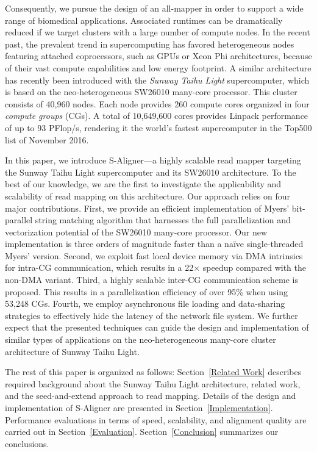 \documentclass[conference]{IEEEtran}
\begin{document}
Consequently, we pursue the design of an all-mapper in order to support a wide range of biomedical applications. Associated runtimes can be dramatically reduced if we target clusters with a large number of compute nodes. In the recent past, the prevalent trend in supercomputing has favored heterogeneous nodes featuring attached coprocessors, such as GPUs or Xeon Phi architectures, because of their vast compute capabilities and low energy footprint. A similar architecture has recently been introduced with the \emph{Sunway Taihu Light} supercomputer, which is based on the neo-heterogeneous SW26010 many-core processor. This cluster consists of 40,960 nodes. Each node provides 260 compute cores organized in four {\em compute groups} (CGs). A total of 10,649,600 cores provides Linpack performance of up to 93 PFlop/s, rendering it the world's fastest supercomputer in the Top500 list of November 2016.

In this paper, we introduce S-Aligner---a highly scalable read mapper targeting the Sunway Taihu Light supercomputer and its SW26010 architecture. To the best of our knowledge, we are the first to investigate the applicability and scalability of read mapping on this architecture. Our approach relies on four major contributions. First, we provide an efficient implementation of Myers' bit-parallel string matching algorithm that harnesses the full parallelization and vectorization potential of the SW26010 many-core processor. Our new implementation is three orders of magnitude faster than a na\"ive single-threaded Myers' version. Second, we exploit fast local device memory via DMA intrinsics for intra-CG communication, which results in a 22$\times$ speedup compared with the non-DMA variant. Third, a highly scalable inter-CG communication scheme is proposed. This results in a parallelization efficiency of over 95\% when using 53,248 CGs. Fourth, we employ asynchronous file loading and data-sharing strategies to effectively hide the latency of the network file system. We further expect that the presented techniques can guide the design and implementation of similar types of applications on the neo-heterogeneous many-core cluster architecture of Sunway Taihu Light. 

The rest of this paper is organized as follows: Section~\ref{Related Work} describes required background about the Sunway Taihu Light architecture, related work, and the seed-and-extend approach to read mapping. Details of the design and implementation of S-Aligner are presented in Section~\ref{Implementation}. Performance evaluations in terms of speed, scalability, and alignment quality are carried out in Section~\ref{Evaluation}. Section~\ref{Conclusion} summarizes our conclusions.
\end{document}
